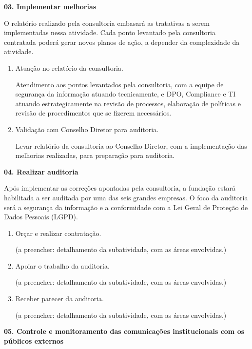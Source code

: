 \documentclass[12pt,a4paper]{article}
\newcommand{\atividade}[1]{%
  \par\vspace{\dimexpr16pt-\parskip\relax}%
  {\bfseries\color{azulAtividade}#1}%
  \par\vspace{\dimexpr8pt-\parskip\relax}%
}
\begin{document}
\atividade{03. Implementar melhorias}

O relatório realizado pela consultoria embasará as tratativas a serem implementadas nessa atividade. Cada ponto levantado pela consultoria contratada poderá gerar novos planos de ação, a depender da complexidade da atividade.

\begin{enumerate}
  \item Atuação no relatório da consultoria.

        Atendimento aos pontos levantados pela consultoria, com a equipe de segurança da informação atuando tecnicamente, e DPO, Compliance e TI atuando estrategicamente na revisão de processos, elaboração de políticas e revisão de procedimentos que se fizerem necessários.
  \item Validação com Conselho Diretor para auditoria.

        Levar relatório da consultoria ao Conselho Diretor, com a implementação das melhorias realizadas, para preparação para auditoria.
\end{enumerate}

\atividade{04. Realizar auditoria}

Após implementar as correções apontadas pela consultoria, a fundação estará habilitada a ser auditada por uma das seis grandes empresas. O foco da auditoria será a segurança da informação e a conformidade com a Lei Geral de Proteção de Dados Pessoais (LGPD).

\begin{enumerate}
  \item Orçar e realizar contratação.

        (a preencher: detalhamento da subatividade, com as áreas envolvidas.)
  \item Apoiar o trabalho da auditoria.

        (a preencher: detalhamento da subatividade, com as áreas envolvidas.)
  \item Receber parecer da auditoria.

        (a preencher: detalhamento da subatividade, com as áreas envolvidas.)
\end{enumerate}

\atividade{05. Controle e monitoramento das comunicações institucionais com os públicos externos}
\end{document}

